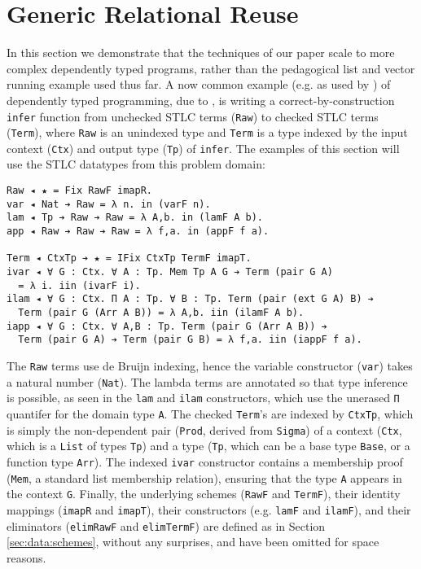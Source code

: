 \documentclass[acmsmall]{acmart}\settopmatter{}
\newcommand{\refsec}[1]{Section \ref{sec:#1}}
\newcommand{\labsec}[1]{\label{sec:#1}}
\begin{document}
\section{Generic Relational Reuse}
\labsec{rel}

In this section we demonstrate that the techniques of our paper scale
to more complex dependently typed programs, rather than
the pedagogical list and vector running example used thus far. A now
common example (e.g. as used by \citet{tutorial:agda}) of
dependently typed programming, due to \citet{viewfromleft}, is writing
a correct-by-construction \verb;infer; function from unchecked STLC
terms (\verb;Raw;) to checked STLC terms (\verb;Term;), where
\verb;Raw; is an unindexed type and \verb;Term; is a type indexed by
the input context (\verb;Ctx;) and output type (\verb;Tp;) of
\verb;infer;. The examples of this section will use the STLC datatypes
from this problem domain:
\begin{verbatim}
Raw ◂ ★ = Fix RawF imapR.
var ◂ Nat ➔ Raw = λ n. in (varF n).
lam ◂ Tp ➔ Raw ➔ Raw = λ A,b. in (lamF A b).
app ◂ Raw ➔ Raw ➔ Raw = λ f,a. in (appF f a).

Term ◂ CtxTp ➔ ★ = IFix CtxTp TermF imapT.
ivar ◂ ∀ G : Ctx. ∀ A : Tp. Mem Tp A G ➔ Term (pair G A)
  = λ i. iin (ivarF i).
ilam ◂ ∀ G : Ctx. Π A : Tp. ∀ B : Tp. Term (pair (ext G A) B) ➔
  Term (pair G (Arr A B)) = λ A,b. iin (ilamF A b).
iapp ◂ ∀ G : Ctx. ∀ A,B : Tp. Term (pair G (Arr A B)) ➔
  Term (pair G A) ➔ Term (pair G B) = λ f,a. iin (iappF f a).
\end{verbatim}
The \verb;Raw; terms use de Bruijn indexing, hence the variable
constructor (\verb;var;) takes a natural number (\verb;Nat;). The
lambda terms are annotated so that type inference is possible, as seen
in the \verb;lam; and \verb;ilam; constructors, which use the unerased
\verb;Π; quantifer for the domain type \verb;A;. The checked
\verb;Term;'s are indexed by \verb;CtxTp;, which is simply the
non-dependent pair (\verb;Prod;, derived from \verb;Sigma;) of a
context (\verb;Ctx;, which is a \verb;List; of types \verb;Tp;) and a
type (\verb;Tp;, which can be a base type \verb;Base;, or a function
type \verb;Arr;). The indexed \verb;ivar; constructor contains a
membership proof (\verb;Mem;, a standard list membership relation),
ensuring that the type \verb;A; appears in the context
\verb;G;. Finally, the underlying schemes (\verb;RawF; and
\verb;TermF;), their identity mappings (\verb;imapR; and
\verb;imapT;), their constructors (e.g. \verb;lamF; and \verb;ilamF;),
and their eliminators (\verb;elimRawF; and \verb;elimTermF;) are
defined as in \refsec{data:schemes}, without any surprises, and have
been omitted for space reasons.
\end{document}
